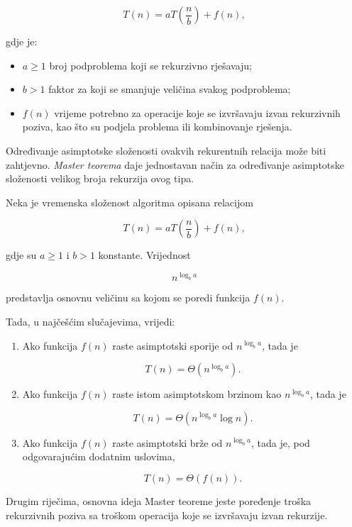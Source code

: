 \[
T(n)=aT\left(\frac{n}{b}\right)+f(n),
\]

gdje je:

\begin{itemize}
	\item $a \geq 1$ broj podproblema koji se rekurzivno rješavaju;
	\item $b > 1$ faktor za koji se smanjuje veličina svakog podproblema;
	\item $f(n)$ vrijeme potrebno za operacije koje se izvršavaju izvan
	rekurzivnih poziva, kao što su podjela problema ili kombinovanje rješenja.
\end{itemize}

Određivanje asimptotske složenosti ovakvih rekurentnih relacija može biti
zahtjevno. \emph{Master teorema} daje jednostavan način za određivanje
asimptotske složenosti velikog broja rekurzija ovog tipa.

\begin{theorem}
	Neka je vremenska složenost algoritma opisana relacijom
	
	\[
	T(n)=aT\left(\frac{n}{b}\right)+f(n),
	\]
	
	gdje su $a\geq 1$ i $b>1$ konstante. Vrijednost
	
	\[
	n^{\log_b a}
	\]
	
	predstavlja osnovnu veličinu sa kojom se poredi funkcija $f(n)$.
	
	Tada, u najčešćim slučajevima, vrijedi:
	
	\begin{enumerate}
		\item Ako funkcija $f(n)$ raste asimptotski sporije od
		$n^{\log_b a}$, tada je
		
		\[
		T(n)=\Theta\left(n^{\log_b a}\right).
		\]
		
		\item Ako funkcija $f(n)$ raste istom asimptotskom brzinom kao
		$n^{\log_b a}$, tada je
		
		\[
		T(n)=\Theta\left(n^{\log_b a}\log n\right).
		\]
		
		\item Ako funkcija $f(n)$ raste asimptotski brže od
		$n^{\log_b a}$, tada je, pod odgovarajućim dodatnim uslovima,
		
		\[
		T(n)=\Theta(f(n)).
		\]
	\end{enumerate}
\end{theorem}

Drugim riječima, osnovna ideja Master teoreme jeste poređenje troška
rekurzivnih poziva sa troškom operacija koje se izvršavaju izvan rekurzije.

